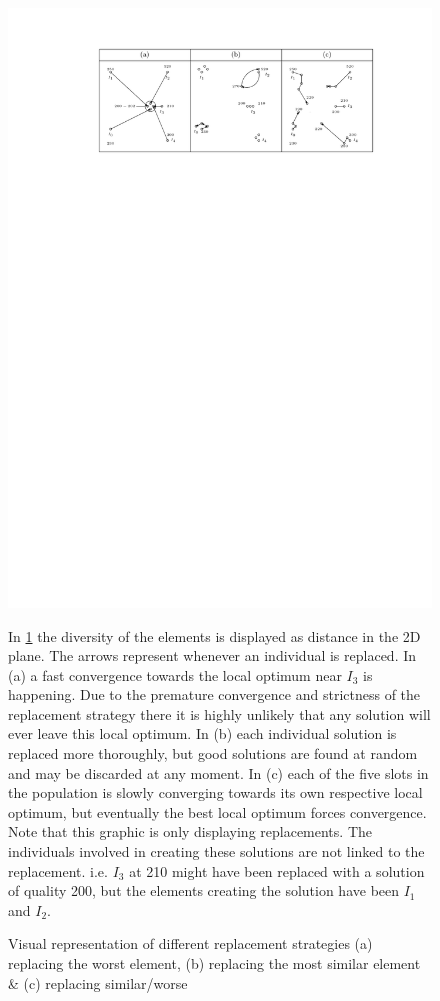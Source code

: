 \documentclass[a4paper,12pt,titlepage, BCOR7mm,headsepline]{scrbook}
\numberwithin{equation}{section}
\begin{document}
\begin{figure}[H] 

    \vspace*{-.25cm}
  \begin{center}
   \includegraphics[width=.8\textwidth]{Ipe/diverse_example.pdf}
  \caption{Visual representation of different replacement strategies (a) replacing the worst element, (b) replacing the most similar element \& (c) replacing similar/worse}
  \label{fig:diverse_graphic}
  \end{center}
  In \ref{fig:diverse_graphic} the diversity of the elements is displayed as distance in the 2D plane. The arrows represent whenever an individual is replaced. In (a) a fast convergence towards the local optimum near $I_3$ is happening. Due to the premature convergence and strictness of the replacement strategy there it is highly unlikely that any solution will ever leave this local optimum. In (b) each individual solution is replaced more thoroughly, but good solutions are found at random and may be discarded at any moment. In (c) each of the five slots in the population is slowly converging towards its own respective local optimum, but eventually the best local optimum forces convergence. Note that this graphic is only displaying replacements. The individuals involved in creating these solutions are not linked to the replacement. i.e. $I_3$ at 210 might have been replaced with a solution of quality 200, but the elements creating the solution have been $I_1$ and $I_2$.
\end{figure}
\end{document}
